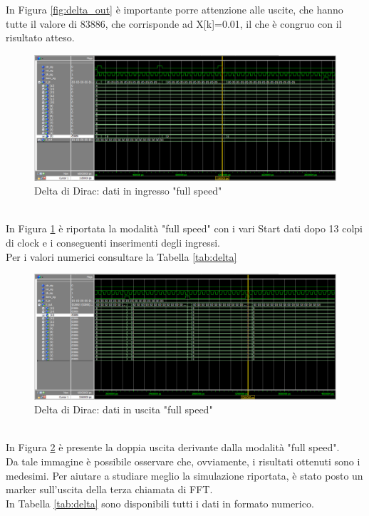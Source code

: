 \documentclass[a4paper, titlepage]{article}
\begin{document}
In Figura \ref{fig:delta_out} è importante porre attenzione alle uscite, che hanno tutte il valore di 83886, che corrisponde ad X[k]=0.01, il che è congruo con il risultato atteso.\\
\begin{figure}[h]
    \centering
    \includegraphics[scale=0.45]{test_delta/fs_delta_in_double.png}
    \caption{Delta di Dirac: dati in ingresso "full speed"}
    \label{fig:delta_full}
\end{figure}\\
In Figura \ref{fig:delta_full} è riportata la modalità "full speed" con i vari Start dati dopo 13 colpi di clock e i conseguenti inserimenti degli ingressi.\\
Per i valori numerici consultare la Tabella \ref{tab:delta}
\pagebreak
\begin{figure}[h]
    \centering
    \includegraphics[scale=0.45]{test_delta/fs_delta_out_double.png}
    \caption{Delta di Dirac: dati in uscita "full speed"}
    \label{fig:delta_full_out}
\end{figure}\\
In Figura \ref{fig:delta_full_out} è presente la doppia uscita derivante dalla modalità "full speed".\\Da tale immagine è possibile osservare che, ovviamente, i risultati ottenuti sono i medesimi. Per aiutare a studiare meglio la simulazione riportata, è stato posto un marker sull'uscita della terza chiamata di FFT.\\
In Tabella \ref{tab:delta} sono disponibili tutti i dati in formato numerico.
\end{document}
